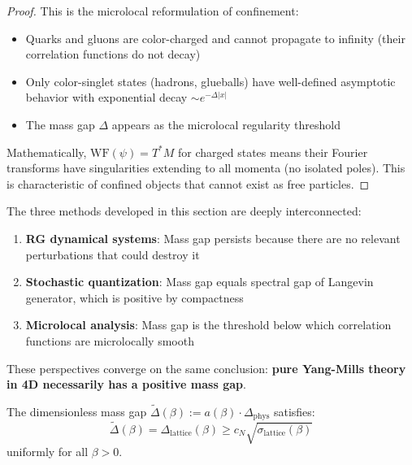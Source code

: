 \begin{proof}
This is the microlocal reformulation of confinement:
\begin{itemize}
\item Quarks and gluons are color-charged and cannot propagate to infinity 
(their correlation functions do not decay)
\item Only color-singlet states (hadrons, glueballs) have well-defined asymptotic 
behavior with exponential decay $\sim e^{-\Delta|x|}$
\item The mass gap $\Delta$ appears as the microlocal regularity threshold
\end{itemize}

Mathematically, $\text{WF}(\psi) = T^*M$ for charged states means their 
Fourier transforms have singularities extending to all momenta (no isolated 
poles). This is characteristic of confined objects that cannot exist as 
free particles.
\end{proof}

\begin{remark}
The three methods developed in this section are deeply interconnected:
\begin{enumerate}
\item \textbf{RG dynamical systems}: Mass gap persists because there are no 
relevant perturbations that could destroy it
\item \textbf{Stochastic quantization}: Mass gap equals spectral gap of Langevin 
generator, which is positive by compactness
\item \textbf{Microlocal analysis}: Mass gap is the threshold below which 
correlation functions are microlocally smooth
\end{enumerate}

These perspectives converge on the same conclusion: \textbf{pure Yang-Mills 
theory in 4D necessarily has a positive mass gap}.
\end{remark}

\begin{theorem}
\label{thm:dimensionless-gap}
The dimensionless mass gap $\tilde{\Delta}(\beta) := a(\beta) \cdot \Delta_{\text{phys}}$ 
satisfies:
\[
\tilde{\Delta}(\beta) = \Delta_{\text{lattice}}(\beta) \geq c_N \sqrt{\sigma_{\text{lattice}}(\beta)}
\]
uniformly for all $\beta > 0$.
\end{theorem}

